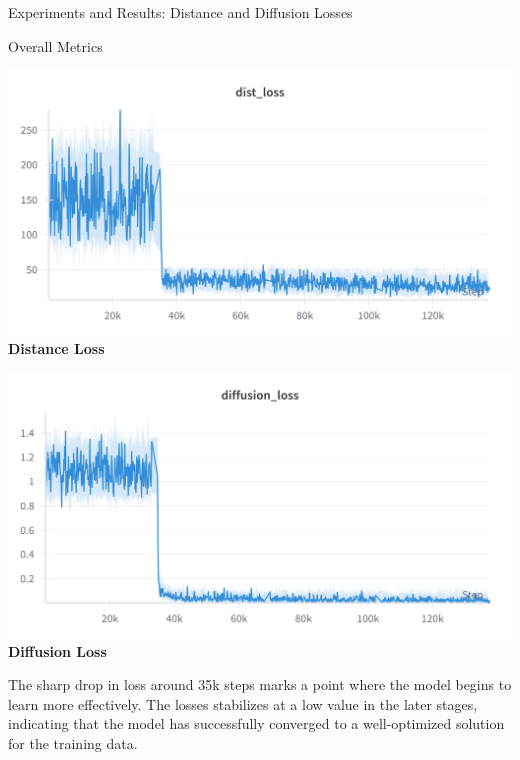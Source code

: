 \documentclass{beamer}
\begin{document}
    \begin{frame}{Experiments and Results: Distance and Diffusion Losses}
        \begin{block}{Overall Metrics}
            \begin{minipage}{0.48\textwidth}
                \centering
                \includegraphics[width=\textwidth]{images/dist_loss.png}
                \textbf{Distance Loss}
            \end{minipage}
            \hfill
            \begin{minipage}{0.48\textwidth}
                \centering
                \includegraphics[width=\textwidth]{images/diffusion_loss.png}
                \textbf{Diffusion Loss}
            \end{minipage}
        \end{block}
    The sharp drop in loss around 35k steps marks a point where the model begins to learn more effectively.
    The losses stabilizes at a low value in the later stages, indicating that the model has successfully converged to a well-optimized solution for the training data.
    \end{frame}
\end{document}
